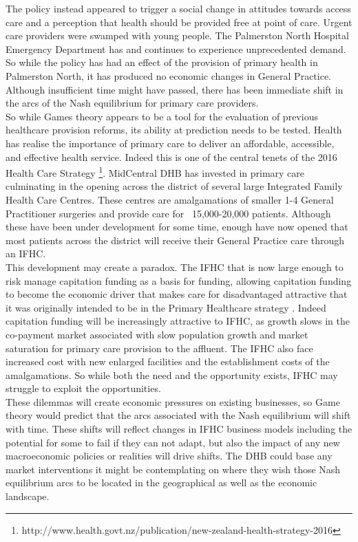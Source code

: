 \documentclass[11pt,a4paper]{article}
\begin{document}
The policy instead appeared to trigger a social change in attitudes towards access care and a perception that health should be provided free at point of care. Urgent care providers were swamped with young people. The Palmerston North Hospital Emergency Department has and continues to experience unprecedented demand. So while the policy has had an effect of the provision of primary health in Palmerston North, it has produced no economic changes in General Practice. Although insufficient time might have passed, there has been immediate shift in the arcs of the Nash equilibrium for primary care providers.\\

So while Games theory appears to be a tool for the evaluation of previous healthcare provision reforms, its ability at prediction needs to be tested. Health has realise the importance of primary care to deliver an affordable, accessible, and effective health service. Indeed this is one of the central tenets of the 2016 Health Care Strategy \footnote{http://www.health.govt.nz/publication/new-zealand-health-strategy-2016}. MidCentral DHB has invested in primary care culminating in the opening across the district of several large Integrated Family Health Care Centres. These centres are amalgamations of smaller 1-4 General Practitioner surgeries and provide care for ~15,000-20,000 patients. Although these have been under development for some time, enough have now opened that most patients across the district will receive their General Practice care through an IFHC.\\


This development may create a paradox. The IFHC that is now large enough to risk manage capitation funding as a basis for funding, allowing capitation funding to become the economic driver that makes care for disadvantaged attractive that it was originally intended to be in the Primary Healthcare strategy \citep{king2001primary}. Indeed capitation funding will be increasingly attractive to IFHC, as growth slows in the co-payment market associated with slow population growth and market saturation for primary care provision to the affluent. The IFHC also face increased cost with new enlarged facilities and the establishment costs of the amalgamations. So while both the need and the opportunity exists, IFHC may struggle to exploit the opportunities.\\

These dilemmas will create economic pressures on existing businesses, so Game theory would predict that the arcs associated with the Nash equilibrium will shift with time. These shifts will reflect changes in IFHC business models including the potential for some to fail if they can not adapt, but also the impact of any new macroeconomic policies or realities will drive shifts. The DHB could base any market interventions it might be contemplating on where they wish those Nash equilibrium arcs to be located in the geographical as well as the economic landscape.\\
\end{document}
